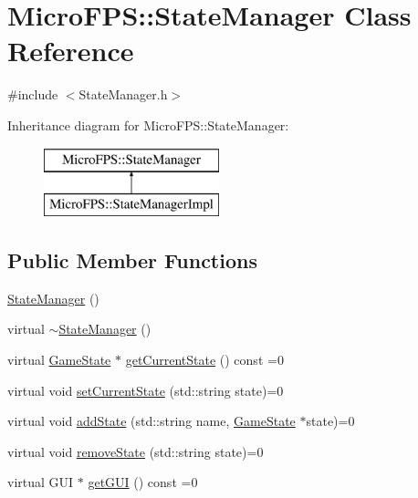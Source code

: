 \hypertarget{class_micro_f_p_s_1_1_state_manager}{
\section{MicroFPS::StateManager Class Reference}
\label{d2/dbd/class_micro_f_p_s_1_1_state_manager}
}


{\ttfamily \#include $<$StateManager.h$>$}

Inheritance diagram for MicroFPS::StateManager:\begin{figure}[H]
\begin{center}
\leavevmode
\includegraphics[height=2.000000cm]{d2/dbd/class_micro_f_p_s_1_1_state_manager}
\end{center}
\end{figure}
\subsection*{Public Member Functions}
\begin{DoxyCompactItemize}
\item 
\hyperlink{class_micro_f_p_s_1_1_state_manager_a05450ac05314e7f0ca504c814809ba32}{StateManager} ()
\item 
virtual \hyperlink{class_micro_f_p_s_1_1_state_manager_ab07b0637b6730764afd561a9cae29b02}{$\sim$StateManager} ()
\item 
virtual \hyperlink{class_micro_f_p_s_1_1_game_state}{GameState} $\ast$ \hyperlink{class_micro_f_p_s_1_1_state_manager_ac7399e6e56923dd9b45e3ae1169b55f7}{getCurrentState} () const =0
\item 
virtual void \hyperlink{class_micro_f_p_s_1_1_state_manager_a6fe3b8c2c4cc7f577438c5b1595d973c}{setCurrentState} (std::string state)=0
\item 
virtual void \hyperlink{class_micro_f_p_s_1_1_state_manager_ac0d581ea9f4e2d1f15055a3cf749508a}{addState} (std::string name, \hyperlink{class_micro_f_p_s_1_1_game_state}{GameState} $\ast$state)=0
\item 
virtual void \hyperlink{class_micro_f_p_s_1_1_state_manager_a19423bbbfcdc714c176e0be4073355f0}{removeState} (std::string state)=0
\item 
virtual GUI $\ast$ \hyperlink{class_micro_f_p_s_1_1_state_manager_a87e67ff37f90da0d9ad15a8411f98d69}{getGUI} () const =0
\end{DoxyCompactItemize}


